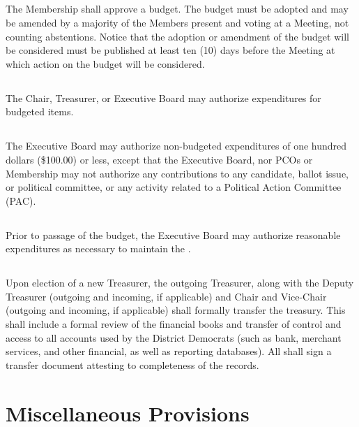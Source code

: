 \subsection{}\label{budget-adoption}
The Membership shall approve a budget. The budget must be adopted and may be amended by a majority of the Members present and voting at a Meeting, not counting abstentions. Notice that the adoption or amendment of the budget will be considered must be published at least ten (10) days before the Meeting at which action on the budget will be considered.

\subsection{}
The Chair, Treasurer, or Executive Board may authorize expenditures for budgeted items.

\subsection{}
The Executive Board may authorize non-budgeted expenditures of one hundred dollars (\$100.00) or less, except that the Executive Board, nor PCOs or Membership may not authorize any contributions to any candidate, ballot issue, or political committee, or any activity related to a Political Action Committee (PAC).

\subsection{}
Prior to passage of the budget, the Executive Board may authorize reasonable expenditures as necessary to maintain the .

\subsection{}
Upon election of a new Treasurer, the outgoing Treasurer, along with the Deputy Treasurer (outgoing and incoming, if applicable) and Chair and Vice-Chair (outgoing and incoming, if applicable) shall formally transfer the treasury. This shall include a formal review of the financial books and transfer of control and access to all accounts used by the \fortythird{} District Democrats (such as bank, merchant services, and other financial, as well as reporting databases). All shall sign a transfer document attesting to completeness of the records.

\section{Miscellaneous Provisions}
